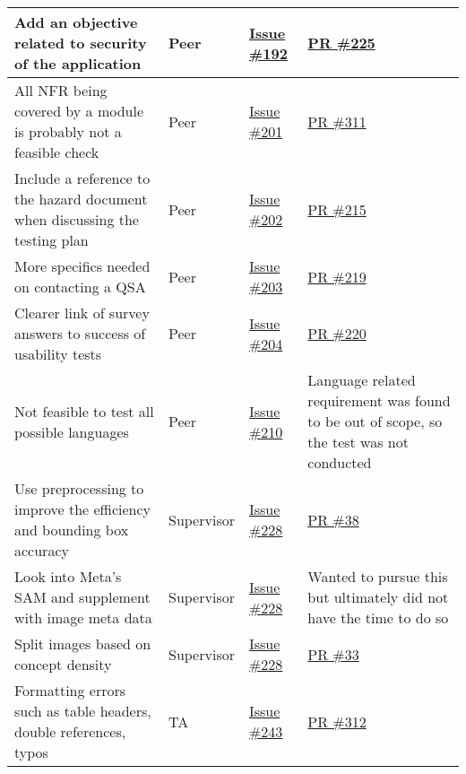 \documentclass{article}
\begin{document}
\begin{longtable}{|p{5cm}|p{1.5cm}|p{2cm}|p{5cm}|}
Add an objective related to security of the application & Peer & \href{https://github.com/OKKM-insights/OKKM.insights/issues/192}{Issue \#192} & \href{https://github.com/OKKM-insights/OKKM.insights/pull/225}{PR \#225} \\ \hline
All NFR being covered by a module is probably not a feasible check & Peer & \href{https://github.com/OKKM-insights/OKKM.insights/issues/201}{Issue \#201} & \href{https://github.com/OKKM-insights/OKKM.insights/pull/311}{PR \#311} \\ \hline
Include a reference to the hazard document when discussing the testing plan & Peer & \href{https://github.com/OKKM-insights/OKKM.insights/issues/202}{Issue \#202} & \href{https://github.com/OKKM-insights/OKKM.insights/pull/215}{PR \#215} \\ \hline
More specifics needed on contacting a QSA & Peer & \href{https://github.com/OKKM-insights/OKKM.insights/issues/203}{Issue \#203} & \href{https://github.com/OKKM-insights/OKKM.insights/pull/219}{PR \#219} \\ \hline
Clearer link of survey answers to success of usability tests & Peer & \href{https://github.com/OKKM-insights/OKKM.insights/issues/204}{Issue \#204} & \href{https://github.com/OKKM-insights/OKKM.insights/pull/220}{PR \#220} \\ \hline
Not feasible to test all possible languages & Peer & \href{https://github.com/OKKM-insights/OKKM.insights/issues/210}{Issue \#210} & Language related requirement was found to be out of scope, so the test was not conducted \\ \hline
Use preprocessing to improve the efficiency and bounding box accuracy & Supervisor & \href{https://github.com/OKKM-insights/OKKM.insights/issues/228}{Issue \#228} & \href{https://github.com/OKKM-insights/backend/pull/38}{PR \#38} \\ \hline
Look into Meta's SAM and supplement with image meta data & Supervisor & \href{https://github.com/OKKM-insights/OKKM.insights/issues/228}{Issue \#228} & Wanted to pursue this but ultimately did not have the time to do so \\ \hline
Split images based on concept density & Supervisor & \href{https://github.com/OKKM-insights/OKKM.insights/issues/228}{Issue \#228} & \href{https://github.com/OKKM-insights/backend/pull/33}{PR \#33} \\ \hline
Formatting errors such as table headers, double references, typos & TA & \href{https://github.com/OKKM-insights/OKKM.insights/issues/243}{Issue \#243} & \href{https://github.com/OKKM-insights/OKKM.insights/pull/312}{PR \#312} \\ \hline

\end{longtable}
\end{document}

